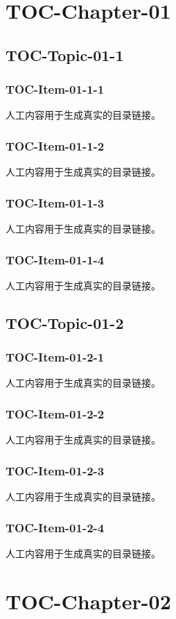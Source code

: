 \tableofcontents
\section{TOC-Chapter-01}
\subsection{TOC-Topic-01-1}
\subsubsection{TOC-Item-01-1-1}
人工内容用于生成真实的目录链接。
\subsubsection{TOC-Item-01-1-2}
人工内容用于生成真实的目录链接。
\subsubsection{TOC-Item-01-1-3}
人工内容用于生成真实的目录链接。
\subsubsection{TOC-Item-01-1-4}
人工内容用于生成真实的目录链接。
\subsection{TOC-Topic-01-2}
\subsubsection{TOC-Item-01-2-1}
人工内容用于生成真实的目录链接。
\subsubsection{TOC-Item-01-2-2}
人工内容用于生成真实的目录链接。
\subsubsection{TOC-Item-01-2-3}
人工内容用于生成真实的目录链接。
\subsubsection{TOC-Item-01-2-4}
人工内容用于生成真实的目录链接。
\section{TOC-Chapter-02}
